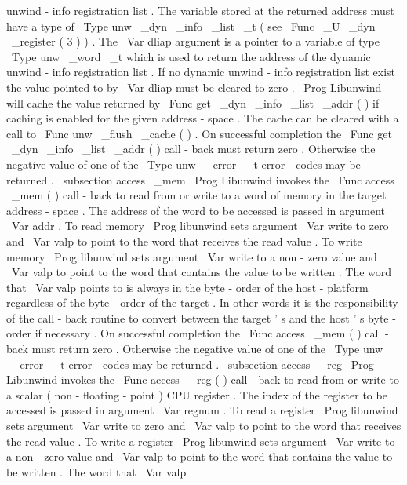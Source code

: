 unwind
-
info
registration
list
.
The
variable
stored
at
the
returned
address
must
have
a
type
of
\
Type
{
unw
\
_dyn
\
_info
\
_list
\
_t
}
(
see
\
Func
{
\
_U
\
_dyn
\
_register
}
(
3
)
)
.
The
\
Var
{
dliap
}
argument
is
a
pointer
to
a
variable
of
type
\
Type
{
unw
\
_word
\
_t
}
which
is
used
to
return
the
address
of
the
dynamic
unwind
-
info
registration
list
.
If
no
dynamic
unwind
-
info
registration
list
exist
the
value
pointed
to
by
\
Var
{
dliap
}
must
be
cleared
to
zero
.
\
Prog
{
Libunwind
}
will
cache
the
value
returned
by
\
Func
{
get
\
_dyn
\
_info
\
_list
\
_addr
}
(
)
if
caching
is
enabled
for
the
given
address
-
space
.
The
cache
can
be
cleared
with
a
call
to
\
Func
{
unw
\
_flush
\
_cache
}
(
)
.
On
successful
completion
the
\
Func
{
get
\
_dyn
\
_info
\
_list
\
_addr
}
(
)
call
-
back
must
return
zero
.
Otherwise
the
negative
value
of
one
of
the
\
Type
{
unw
\
_error
\
_t
}
error
-
codes
may
be
returned
.
\
subsection
{
access
\
_mem
}
\
Prog
{
Libunwind
}
invokes
the
\
Func
{
access
\
_mem
}
(
)
call
-
back
to
read
from
or
write
to
a
word
of
memory
in
the
target
address
-
space
.
The
address
of
the
word
to
be
accessed
is
passed
in
argument
\
Var
{
addr
}
.
To
read
memory
\
Prog
{
libunwind
}
sets
argument
\
Var
{
write
}
to
zero
and
\
Var
{
valp
}
to
point
to
the
word
that
receives
the
read
value
.
To
write
memory
\
Prog
{
libunwind
}
sets
argument
\
Var
{
write
}
to
a
non
-
zero
value
and
\
Var
{
valp
}
to
point
to
the
word
that
contains
the
value
to
be
written
.
The
word
that
\
Var
{
valp
}
points
to
is
always
in
the
byte
-
order
of
the
host
-
platform
regardless
of
the
byte
-
order
of
the
target
.
In
other
words
it
is
the
responsibility
of
the
call
-
back
routine
to
convert
between
the
target
'
s
and
the
host
'
s
byte
-
order
if
necessary
.
On
successful
completion
the
\
Func
{
access
\
_mem
}
(
)
call
-
back
must
return
zero
.
Otherwise
the
negative
value
of
one
of
the
\
Type
{
unw
\
_error
\
_t
}
error
-
codes
may
be
returned
.
\
subsection
{
access
\
_reg
}
\
Prog
{
Libunwind
}
invokes
the
\
Func
{
access
\
_reg
}
(
)
call
-
back
to
read
from
or
write
to
a
scalar
(
non
-
floating
-
point
)
CPU
register
.
The
index
of
the
register
to
be
accessed
is
passed
in
argument
\
Var
{
regnum
}
.
To
read
a
register
\
Prog
{
libunwind
}
sets
argument
\
Var
{
write
}
to
zero
and
\
Var
{
valp
}
to
point
to
the
word
that
receives
the
read
value
.
To
write
a
register
\
Prog
{
libunwind
}
sets
argument
\
Var
{
write
}
to
a
non
-
zero
value
and
\
Var
{
valp
}
to
point
to
the
word
that
contains
the
value
to
be
written
.
The
word
that
\
Var
{
valp
}
